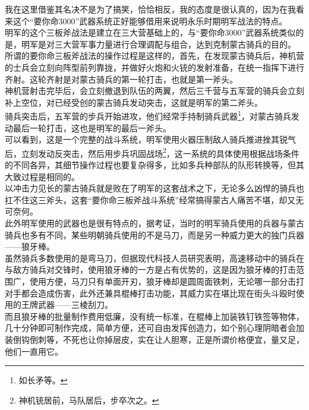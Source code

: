 \begin{multicols}{\theparacolNo}
我在这里借鉴其名决不是为了搞笑，恰恰相反，我的态度是很认真的，因为在我看来这个“要你命3000”武器系统正好能够借用来说明永乐时期明军战法的特点。\\

明军的这个三板斧战法是建立在三大营基础上的，与“要你命3000”武器系统类似的是，明军是对三大营军事力量进行合理调配与组合，达到克制蒙古骑兵的目的。\\

所谓的要你命三板斧战法的操作过程是这样的，首先，在发现蒙古骑兵后，神机营的士兵会立刻向阵型前列靠拢，并做好火炮和火铳的发射准备，在统一指挥下进行齐射。这轮齐射是对蒙古骑兵的第一轮打击，也就是第一斧头。\\

神机营射击完毕后，会立刻撤退到队伍的两翼，然后三千营与五军营的骑兵会立刻补上空位，对已经受创的蒙古骑兵发动突击，这就是明军的第二斧头。\\

骑兵突击后，五军营的步兵开始进攻，他们经常手持制骑兵武器\footnote{如长矛等。}，对蒙古骑兵发动最后一轮打击，这也是明军的最后一斧头。\\

可以看到，这是一个完整的战斗系统，明军使用火器压制敌人骑兵推进挫其锐气后，立刻发动反突击，然后用步兵巩固战场\footnote{神机铳居前，马队居后，步卒次之。}，这一系统的具体使用根据战场条件的不同各异，其细节操作过程也要复杂得多，比如多兵种部队的队形转换等，但其大致过程是相同的。\\

以冲击力见长的蒙古骑兵就是败在了明军的这套战术之下，无论多么凶悍的骑兵也扛不住这三斧头，这套“要你命三板斧战斗系统”经常搞得蒙古人痛苦不堪，却又无可奈何。\\

此外明军使用的武器也是很有特点的，据考证，当时的明军骑兵使用的兵器与蒙古骑兵也多有不同，某些明朝骑兵使用的不是马刀，而是另一种威力更大的独门兵器——狼牙棒。\\

虽然骑兵多数使用的是弯马刀，但据现代科技人员研究表明，高速移动中的骑兵在与敌方骑兵对交锋时，使用狼牙棒的一方是占有优势的，这是因为狼牙棒的打击范围广，使用方便，马刀只有单面开刃，狼牙棒却是圆周面铁刺，无论哪一部分击打对手都会造成伤害，此外还兼具棍棒打击功能，其威力实在堪比现在街头斗殴时使用的王牌武器——三棱刮刀。\\

而且狼牙棒的批量制作费用低廉，没有统一标准，在棍棒上加装铁钉铁签等物体，几十分钟即可制作完成，简单方便，还可自由发挥创造力，如个别心理阴暗者会加装倒钩倒刺等，不死也让你掉层皮，实在让人胆寒，正是所谓价格便宜，量又足，他们一直用它。\\


\end{multicols}
